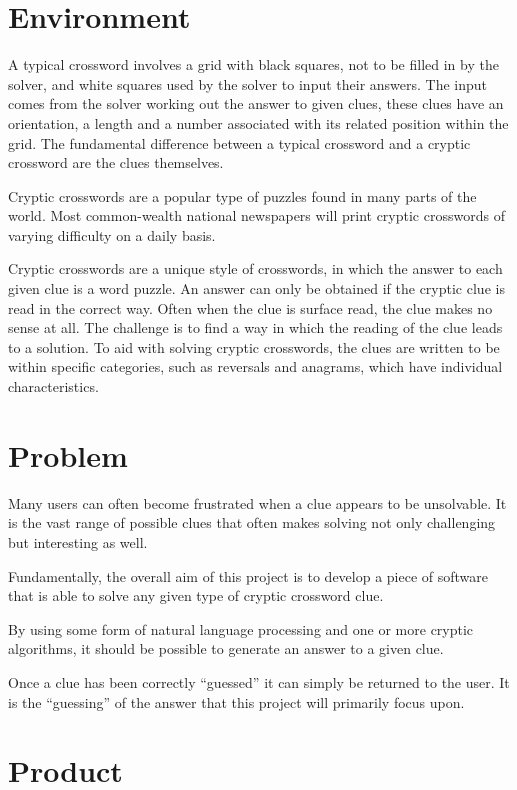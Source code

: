 \section{Environment}

A typical crossword involves a grid with black squares, not to be filled in by the
 solver, and white squares used by the solver to input their answers. The input
 comes from the solver working out the answer to given clues, these clues have
 an orientation, a length and a number associated with its related position within
 the grid. The fundamental difference between a typical crossword and a cryptic
 crossword are the clues themselves. 

Cryptic crosswords are a popular type of puzzles found in many parts of the
 world. Most common-wealth national newspapers will print cryptic crosswords 
of varying difficulty on a daily basis.

Cryptic crosswords are a unique style of crosswords, in which the answer to 
each given clue is a word puzzle. An answer can only be obtained if the cryptic
 clue is read in the correct way. Often when the clue is surface read, the clue
 makes no sense at all. The challenge is to find a way in which the reading of 
the clue leads to a solution. To aid with solving cryptic crosswords, the clues
 are written to be within specific categories, such as reversals and anagrams,
 which have individual characteristics. 


\section{Problem}

Many users can often become frustrated when a clue appears to be unsolvable. It
is the vast range of possible clues that often makes solving not only 
challenging but interesting as well.

Fundamentally, the overall aim of this project is to develop a piece of 
software that is able to solve any given type of cryptic crossword clue.

By using some form of natural language processing and one or more cryptic 
algorithms, it should be possible to generate an answer to a given clue.

Once a clue has been correctly ``guessed'' it can simply be returned to the 
user. It is the ``guessing'' of the answer that this project will primarily 
focus upon.

\section{Product}


